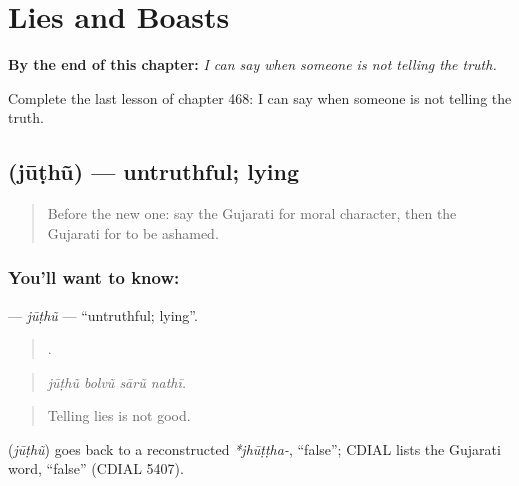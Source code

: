
\chapter{Lies and Boasts}
\label{ch:gu-lies-and-boasts}

\begin{chapteropening}
\textbf{By the end of this chapter:} \emph{I can say when someone is not telling the truth.}

Complete the last lesson of chapter 468: I can say when someone is not telling the truth.
\end{chapteropening}

\section[\texorpdfstring{\gu{જૂઠું} (jūṭhũ)}{જૂઠું (jūṭhũ)}]{ (jūṭhũ) — untruthful; lying}

\label{lesson:GU-C468-juthu}



\begin{quote}
Before the new one: say the Gujarati for moral character, then the Gujarati for to be ashamed.
\end{quote}

\subsection*{You'll want to know: }
\textbf{} — \emph{jūṭhũ} — \textquotedblleft{}untruthful; lying\textquotedblright{}.

\begin{quote}
   .
\end{quote}

\begin{quote}
\emph{jūṭhũ bolvũ sārũ nathī.}
\end{quote}

\begin{quote}
Telling lies is not good.
\end{quote}

\begin{cousinweb}
\textbf{} (\emph{jūṭhũ}) goes back to a reconstructed \emph{*jhūṭṭha-}, \textquotedblleft{}false\textquotedblright{}; CDIAL lists the Gujarati word, \textquotedblleft{}false\textquotedblright{} (CDIAL 5407).
\end{cousinweb}

